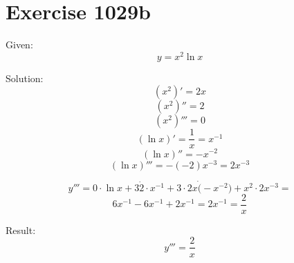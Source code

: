 \documentclass[a4paper, 10pt]{scrartcl}
\begin{document}
\section{Exercise 1029b}

Given:
\[
y = x^{2}\ln{x}
\]

Solution:
\[
(x^{2})' = 2x
\]
\[
(x^{2})'' = 2
\]
\[
(x^{2})''' = 0
\]
\[
(\ln{x})' = \frac{1}{x} = x^{-1}
\]
\[
(\ln{x})'' = -x^{-2}
\]
\[
(\ln{x})''' = -(-2)x^{-3} = 2x^{-3}
\]

\[
y''' = 0\cdot\ln{x} + 3\dot 2\cdot x^{-1} + 3\cdot 2x\dot (-x^{-2}) + x^{2}\cdot 2x^{-3} =
\]
\[
6x^{-1} - 6x^{-1} + 2x^{-1} = 2x^{-1} = \frac{2}{x}
\]

Result:
\[
y''' = \frac{2}{x}
\]
\end{document}
